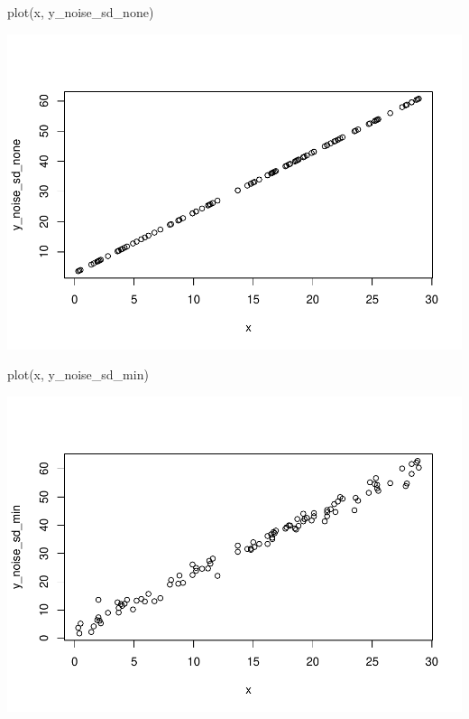 \documentclass[
]{book}
\newenvironment{Shaded}{\begin{snugshade}}{\end{snugshade}}
\newcommand{\FunctionTok}[1]{\textcolor[rgb]{0.00,0.00,0.00}{#1}}
\newcommand{\NormalTok}[1]{#1}
\begin{document}
\begin{Shaded}
\begin{Highlighting}[]
\FunctionTok{plot}\NormalTok{(x, y\_noise\_sd\_none)}
\end{Highlighting}
\end{Shaded}

\includegraphics{test_course_notes_files/figure-latex/remedy006-1.pdf}

\begin{Shaded}
\begin{Highlighting}[]
\FunctionTok{plot}\NormalTok{(x, y\_noise\_sd\_min)}
\end{Highlighting}
\end{Shaded}

\includegraphics{test_course_notes_files/figure-latex/remedy006-2.pdf}
\end{document}
